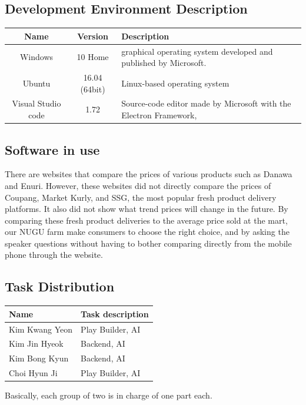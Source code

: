 \documentclass[conference]{IEEEtran}
\begin{document}
\subsection{Development Environment Description}
\begin{table}[h]
\begin{tabular}{|c|c|p{2.5cm}|}
\hline
Name   & Version       & Description                  \\ \hline
Windows            & 10 Home & graphical operating system   developed and published by Microsoft.  \\ \hline
Ubuntu & 16.04 (64bit) & Linux-based operating system \\ \hline
Visual Studio code & 1.72    & Source-code editor made by   Microsoft with the Electron Framework, \\ \hline
\end{tabular}
\end{table}


\subsection{Software in use}
There are websites that compare the prices of various products such as Danawa and Enuri. However, these websites did not directly compare the prices of Coupang, Market Kurly, and SSG, the most popular fresh product delivery platforms. It also did not show what trend prices will change in the future. By comparing these fresh product deliveries to the average price sold at the mart, our NUGU farm make consumers to choose the right choice, and by asking the speaker questions without having to bother comparing directly from the mobile phone through the website.\\

\subsection{Task Distribution}

\begin{table}[h]
\begin{tabular}{|l|l|}
\hline
Name           & Task description   \\ \hline
Kim Kwang Yeon & Play Builder,   AI \\ \hline
Kim Jin Hyeok  & Backend, AI        \\ \hline
Kim Bong Kyun  & Backend, AI        \\ \hline
Choi Hyun Ji   & Play Builder,   AI \\ \hline
\end{tabular}
\end{table}
Basically, each group of two is in charge of one part each.  
\end{document}
